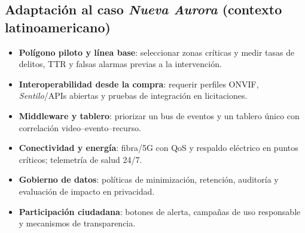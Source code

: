 \documentclass[12pt,a4paper]{article}
\begin{document}
\subsection*{Adaptación al caso \textit{Nueva Aurora} (contexto latinoamericano)}
\begin{itemize}
  \item \textbf{Polígono piloto y línea base}: seleccionar zonas críticas y medir tasas de delitos, TTR y falsas alarmas previas a la intervención.
  \item \textbf{Interoperabilidad desde la compra}: requerir perfiles ONVIF, \textit{Sentilo}/APIs abiertas y pruebas de integración en licitaciones.
  \item \textbf{Middleware y tablero}: priorizar un bus de eventos y un tablero único con correlación video--evento--recurso.
  \item \textbf{Conectividad y energía}: fibra/5G con QoS y respaldo eléctrico en puntos críticos; telemetría de salud 24/7.
  \item \textbf{Gobierno de datos}: políticas de minimización, retención, auditoría y evaluación de impacto en privacidad.
  \item \textbf{Participación ciudadana}: botones de alerta, campañas de uso responsable y mecanismos de transparencia.
\end{itemize}
\end{document}
